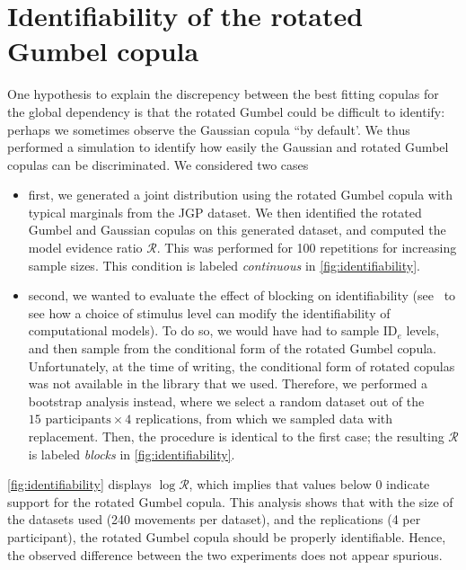 \documentclass[acmlarge, manuscript,review]{acmart}
\newcommand{\ide}{\ensuremath{{\text{ID}_e}}\xspace}
\begin{document}
\section{Identifiability of the rotated Gumbel copula\label{app:identifiability}}
One hypothesis to explain the discrepency between the best fitting copulas for the global dependency is that the rotated Gumbel could be difficult to identify: perhaps we sometimes observe the Gaussian copula ``by default'. We thus performed a simulation to identify how easily the Gaussian and rotated Gumbel copulas can be discriminated. We considered two cases
\begin{itemize}
	\item first, we generated a joint distribution using the rotated Gumbel copula with typical marginals from the JGP dataset. We then identified the rotated Gumbel and Gaussian copulas on this generated dataset, and computed the model evidence ratio $\mathcal{R}$. This was performed for 100 repetitions for increasing sample sizes. This condition is labeled \textit{continuous} in \autoref{fig:identifiability}.
	\item second, we wanted to evaluate the effect of blocking on identifiability (see~\cite{gori2024} to see how a choice of stimulus level can modify the identifiability of computational models). To do so, we would have had to sample \ide levels, and then sample from the conditional form of the rotated Gumbel copula. Unfortunately, at the time of writing, the conditional form of rotated copulas was not available in the library that we used. Therefore, we performed a bootstrap analysis instead, where we select a random dataset out of the $15 \text{ participants} \times 4 \text{ replications}$, from which we sampled data with replacement. Then, the procedure is identical to the first case; the resulting $\mathcal{R}$ is labeled \textit{blocks} in \autoref{fig:identifiability}.
\end{itemize}

\autoref{fig:identifiability} displays $\log \mathcal{R}$, which implies that values below 0 indicate support for the rotated Gumbel copula. This analysis shows that with the size of the datasets used (240 movements per dataset), and the replications (4 per participant), the rotated Gumbel copula should be properly identifiable. Hence, the observed difference between the two experiments does not appear spurious.
\end{document}
